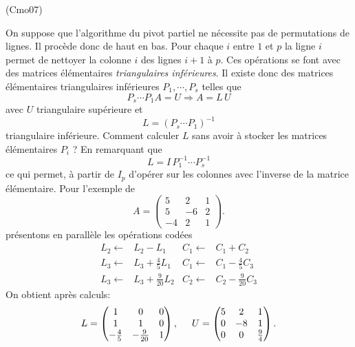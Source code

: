 \begin{tiny}(Cmo07)\end{tiny} On suppose que l'algorithme du pivot partiel ne nécessite pas de permutations de lignes. Il procède donc de haut en bas. Pour chaque $i$ entre $1$ et $p$ la ligne $i$ permet de nettoyer la colonne $i$ des lignes $i+1$ à $p$. Ces opérations se font avec des matrices élémentaires \emph{triangulaires inférieures}.\newline
Il existe donc des matrices élémentaires triangulaires inférieures $P_1, \cdots , P_s$ telles que
\begin{displaymath}
  P_s \cdots P_1 A = U \Rightarrow A = L\,U
\end{displaymath}
avec $U$ triangulaire supérieure et
\begin{displaymath}
  L = \left(P_s \cdots P_1\right)^{-1}  
\end{displaymath}
triangulaire inférieure.\newline
Comment calculer $L$ sans avoir à stocker les matrices élémentaires $P_i$ ?\newline
En remarquant que
\begin{displaymath}
  L = I\, P_1^{-1}\cdots P_s^{-1}
\end{displaymath}
ce qui permet, à partir de $I_p$ d'opérer sur les colonnes avec l'inverse de la matrice élémentaire.\newline
Pour l'exemple de 
\begin{displaymath}
A=\begin{pmatrix}
5 & 2 & 1 \\
5 & -6 & 2 \\
-4 & 2 & 1    
  \end{pmatrix}.
\end{displaymath}
présentons en parallèle les opérations codées
\begin{align*}
  L_2 \leftarrow& L_2 - L_1             &  C_1 \leftarrow& C_1 + C_2 \\
  L_3 \leftarrow& L_3 + \frac{4}{5}L_1  &  C_1 \leftarrow& C_1 -\frac{4}{5} C_3 \\
  L_3 \leftarrow& L_3 + \frac{9}{20}L_2 &  C_2 \leftarrow& C_2 -\frac{9}{20} C_3
\end{align*}
On obtient après calculs:
\begin{displaymath}
L = 
\begin{pmatrix}
  1 & 0 & 0 \\ 1 & 1 & 0 \\ -\frac{4}{5} & -\frac{9}{20} & 1
\end{pmatrix},\hspace{0.5cm}
U = 
\begin{pmatrix}
  5 & 2 & 1 \\ 0 & -8 & 1 \\ 0 & 0 & \frac{9}{4}
\end{pmatrix}.
\end{displaymath}
